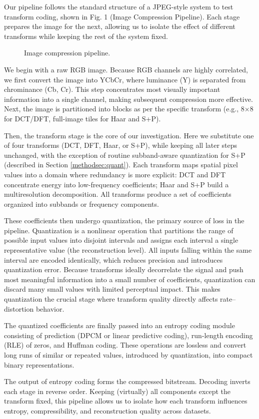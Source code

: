
Our pipeline follows the standard structure of a JPEG-style  system to test transform coding, shown in Fig. 1 (Image Compression Pipeline). Each stage prepares the image for the next, allowing us to isolate the effect of different transforms while keeping the rest of the system fixed.

\begin{figure}[ht]
    \centering
    \resizebox{0.95\linewidth}{!}{%
        
    }
    \caption{Image compression pipeline.}
\end{figure}

We begin with a raw RGB image. Because RGB channels are highly correlated, we first convert the image into YCbCr, where luminance (Y) is separated from chrominance (Cb, Cr). This step concentrates most visually important information into a single channel, making subsequent compression more effective. Next, the image is partitioned into blocks as per the specific transform (e.g., 8×8 for DCT/DFT, full-image tiles for Haar and S+P). 

Then, the transform stage is the core of our investigation. Here we substitute one of four transforms (DCT, DFT, Haar, or S+P), while keeping all later steps unchanged, with the exception of routine subband-aware quantization for S+P (described in Section \ref{methodsec:quant}). Each transform maps spatial pixel values into a domain where redundancy is more explicit: DCT and DFT concentrate energy into low-frequency coefficients; Haar and S+P build a multiresolution decomposition. All transforms produce a set of coefficients organized into subbands or frequency components.

These coefficients then undergo quantization, the primary source of loss in the pipeline. Quantization is a nonlinear operation that partitions the range of possible input values into disjoint intervals and assigns each interval a single representative value (the reconstruction level).
All inputs falling within the same interval are encoded identically, which reduces precision and introduces quantization error. Because transforms ideally decorrelate the signal and push most meaningful information into a small number of coefficients, quantization can discard many small values with limited perceptual impact. This makes quantization the crucial stage where transform quality directly affects rate–distortion behavior.

The quantized coefficients are finally passed into an entropy coding module consisting of prediction (DPCM or linear predictive coding), run-length encoding (RLE) of zeros, and Huffman coding. These operations are lossless and convert long runs of similar or repeated values, introduced by quantization, into compact binary representations.

The output of entropy coding forms the compressed bitstream. Decoding inverts each stage in reverse order. Keeping (virtually) all components except the transform fixed, this pipeline allows us to isolate how each transform influences entropy, compressibility, and reconstruction quality across datasets.